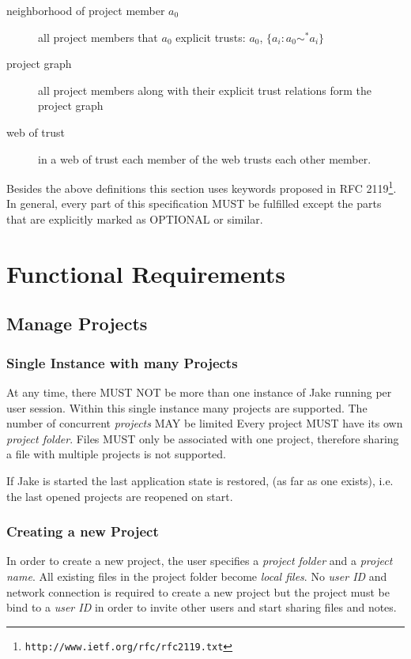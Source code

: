 \begin{description}
\item[neighborhood of project member $a_0$] all project members that $a_0$ explicit trusts: $a_0$, $\{a_i: a_0 \sim ^* a_i\}$
\item[project graph] all project members along with their explicit trust relations form the project graph
\item[web of trust] in a web of trust each member of the web trusts each other member.
\end{description}

Besides the above definitions this section uses keywords proposed in RFC 2119\footnote{\texttt{http://www.ietf.org/rfc/rfc2119.txt}}. In general, every part of this specification MUST be fulfilled except the parts that are explicitly marked as OPTIONAL or similar.

\section{Functional Requirements}

\subsection{Manage Projects}
\subsubsection{Single Instance with many Projects}
At any time, there MUST NOT be more than one instance of Jake running per user session. Within this single instance many projects are supported. The number of concurrent \emph{projects} MAY be limited Every project MUST have its own \emph{project folder}. Files MUST only be associated with one project, therefore sharing a file with multiple projects is not supported.

If Jake is started the last application state is restored, (as far as one exists), i.e. the last opened projects are reopened on start.

\subsubsection{Creating a new Project}
In order to create a new project, the user specifies a \emph{project folder} and a \emph{project name}. All existing files in the project folder become \emph{local files}. No \emph{user ID} and network connection is required to create a new project but the project must be bind to a \emph{user ID} in order to invite other users and start sharing files and notes.

